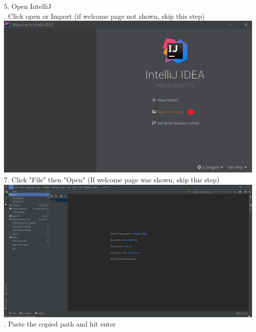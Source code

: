 \begin{flushleft}
    5. Open IntelliJ\\
    . Click open or Import (if welcome page not shown, skip this step)\\
    \vspace{5mm}
    \includegraphics[width=16.5cm]{Report/root/step3.1.png}\\
    7. Click "File" then "Open" (If welcome page was shown, skip this step)\\
    \vspace{5mm}
    \includegraphics[width=16.5cm]{Report/root/step3.2.png}\\
    . Paste the copied path and hit enter\\
    \vspace{5mm}

\end{flushleft}
